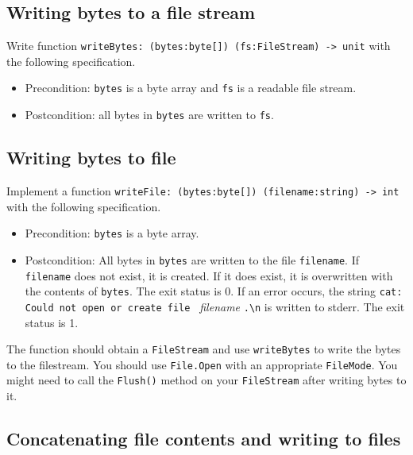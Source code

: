 \subsection*{Writing bytes to a file stream}

Write function \texttt{writeBytes: (bytes:byte[]) (fs:FileStream) -> unit} with the following specification.  
\begin{itemize}
\item Precondition: \texttt{bytes} is a byte array and \texttt{fs} is a readable file stream.
\item Postcondition: all bytes in \texttt{bytes} are written to \texttt{fs}.
\end{itemize}

\subsection*{Writing bytes to file}

Implement a function \texttt{writeFile: (bytes:byte[]) (filename:string) -> int} with the following specification. 
\begin{itemize}
\item Precondition: \texttt{bytes} is a byte array.
\item Postcondition: All bytes in \texttt{bytes} are written to the file \texttt{filename}. If \texttt{filename} does not exist, it is created. If it does exist, it is overwritten with the contents of \texttt{bytes}. The exit status is 0.
  If an error occurs, the string \verb|cat: Could not open or create file | \textit{filename} \verb|.\n| is written to stderr. The exit status is 1.
\end{itemize}

The function should obtain a \texttt{FileStream} and use \texttt{writeBytes} to write the bytes to the filestream. 
You should use \texttt{File.Open} with an appropriate \texttt{FileMode}. 
You might need to call the \texttt{Flush()} method on your \texttt{FileStream} after writing bytes to it. 

\subsection*{Concatenating file contents and writing to files}

